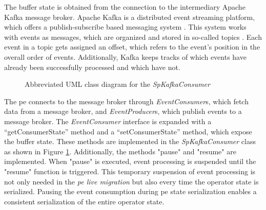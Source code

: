 The buffer state is obtained from the connection to the intermediary Apache Kafka message broker. Apache Kafka is a distributed event streaming platform, which offers a publish-subscribe based messaging system \cite{apacheKafka.2020}. This system works with events as messages, which are organized and stored in so-called topics \cite{apacheKafka.2020}. Each event in a topic gets assigned an offset, which refers to the event's position in the overall order of events. Additionally, Kafka keeps tracks of which events have already been successfully processed and which have not.\\
\begin{figure}[!b]
    \centering
    \caption{Abbreviated UML class diagram for the \textit{SpKafkaConsumer}}
    \label{fKafkaConsumerUML}
\end{figure}
The \gls{pe} connects to the message broker through \textit{EventConsumer}s, which fetch data from a message broker, and \textit{EventProducer}s, which publish events to a message broker. The \textit{EventConsumer} interface is expanded with a “getConsumerState” method and a “setConsumerState” method, which expose the buffer state. These methods are implemented in the \textit{SpKafkaConsumer} class as shown in Figure \ref{fKafkaConsumerUML}. Additionally, the methods "pause" and "resume" are implemented. When "pause" is executed, event processing is suspended until the "resume" function is triggered. This temporary suspension of event processing is not only needed in the \textit{\acrshort{pe} live migration} but also every time the operator state is serialized. Pausing the event consumption during \gls{pe} state serialization enables a consistent serialization of the entire operator state.\\
